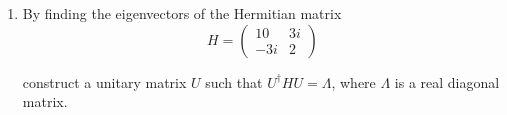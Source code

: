 \documentclass[fleqn]{article}
\begin{document}
\begin{enumerate}
    
    \item By finding the eigenvectors of the Hermitian matrix
      $$H= 
      \begin{pmatrix}
      10 & 3i \\
      -3i & 2 
      \end{pmatrix}
      $$

      construct a unitary matrix $U$ such that $U^\dagger HU=\Lambda$, where $\Lambda$ is a real  diagonal matrix. 


  \end{enumerate}
\end{document}
